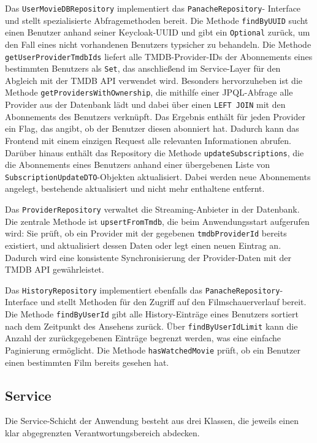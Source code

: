 Das \texttt{UserMovieDBRepository} implementiert das \texttt{PanacheRepository}-
Interface und stellt spezialisierte Abfragemethoden bereit. Die Methode
\texttt{findByUUID} sucht einen Benutzer anhand seiner Keycloak-UUID und gibt
ein \texttt{Optional} zurück, um den Fall eines nicht vorhandenen Benutzers
typsicher zu behandeln. Die Methode \texttt{getUserProviderTmdbIds} liefert
alle TMDB-Provider-IDs der Abonnements eines bestimmten Benutzers als
\texttt{Set}, das anschließend im Service-Layer für den Abgleich mit der
TMDB API verwendet wird. Besonders hervorzuheben ist die Methode
\texttt{getProvidersWithOwnership}, die mithilfe einer JPQL-Abfrage alle
Provider aus der Datenbank lädt und dabei über einen \texttt{LEFT JOIN} mit
den Abonnements des Benutzers verknüpft. Das Ergebnis enthält für jeden
Provider ein Flag, das angibt, ob der Benutzer diesen abonniert hat. Dadurch
kann das Frontend mit einem einzigen Request alle relevanten Informationen
abrufen. Darüber hinaus enthält das Repository die Methode
\texttt{updateSubscriptions}, die die Abonnements eines Benutzers anhand
einer übergebenen Liste von \texttt{SubscriptionUpdateDTO}-Objekten
aktualisiert. Dabei werden neue Abonnements angelegt, bestehende
aktualisiert und nicht mehr enthaltene entfernt.

Das \texttt{ProviderRepository} verwaltet die Streaming-Anbieter in der
Datenbank. Die zentrale Methode ist \texttt{upsertFromTmdb}, die beim
Anwendungsstart aufgerufen wird: Sie prüft, ob ein Provider mit der
gegebenen \texttt{tmdbProviderId} bereits existiert, und aktualisiert
dessen Daten oder legt einen neuen Eintrag an. Dadurch wird eine konsistente
Synchronisierung der Provider-Daten mit der TMDB API gewährleistet.

Das \texttt{HistoryRepository} implementiert ebenfalls das
\texttt{PanacheRepository}-Interface und stellt Methoden für den Zugriff
auf den Filmschauerverlauf bereit. Die Methode \texttt{findByUserId} gibt
alle History-Einträge eines Benutzers sortiert nach dem Zeitpunkt des
Ansehens zurück. Über \texttt{findByUserIdLimit} kann die Anzahl der
zurückgegebenen Einträge begrenzt werden, was eine einfache Paginierung
ermöglicht. Die Methode \texttt{hasWatchedMovie} prüft, ob ein Benutzer
einen bestimmten Film bereits gesehen hat.

\subsection{Service}

Die Service-Schicht der Anwendung besteht aus drei Klassen, die jeweils
einen klar abgegrenzten Verantwortungsbereich abdecken.

